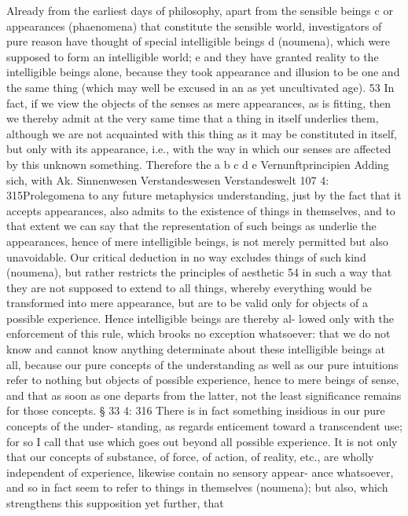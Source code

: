 Already from the earliest days of philosophy, apart from the sensible
beings c or appearances (phaenomena) that constitute the sensible world,
investigators of pure reason have thought of special intelligible beings d
(noumena), which were supposed to form an intelligible world; e and they
have granted reality to the intelligible beings alone, because they took
appearance and illusion to be one and the same thing (which may well
be excused in an as yet uncultivated age). 53
In fact, if we view the objects of the senses as mere appearances, as is
ﬁtting, then we thereby admit at the very same time that a thing in itself
underlies them, although we are not acquainted with this thing as it may
be constituted in itself, but only with its appearance, i.e., with the way in
which our senses are affected by this unknown something. Therefore the
a
b
c
d
e
Vernunftprincipien
Adding sich, with Ak.
Sinnenwesen
Verstandeswesen
Verstandeswelt
107
4: 315Prolegomena to any future metaphysics
understanding, just by the fact that it accepts appearances, also admits to
the existence of things in themselves, and to that extent we can say that
the representation of such beings as underlie the appearances, hence of
mere intelligible beings, is not merely permitted but also unavoidable.
Our critical deduction in no way excludes things of such kind
(noumena), but rather restricts the principles of aesthetic 54 in such a way
that they are not supposed to extend to all things, whereby everything
would be transformed into mere appearance, but are to be valid only for
objects of a possible experience. Hence intelligible beings are thereby al-
lowed only with the enforcement of this rule, which brooks no exception
whatsoever: that we do not know and cannot know anything determinate
about these intelligible beings at all, because our pure concepts of the
understanding as well as our pure intuitions refer to nothing but objects
of possible experience, hence to mere beings of sense, and that as soon as
one departs from the latter, not the least signiﬁcance remains for those
concepts.
§ 33
4: 316
There is in fact something insidious in our pure concepts of the under-
standing, as regards enticement toward a transcendent use; for so I call
that use which goes out beyond all possible experience. It is not only
that our concepts of substance, of force, of action, of reality, etc., are
wholly independent of experience, likewise contain no sensory appear-
ance whatsoever, and so in fact seem to refer to things in themselves
(noumena); but also, which strengthens this supposition yet further, that
